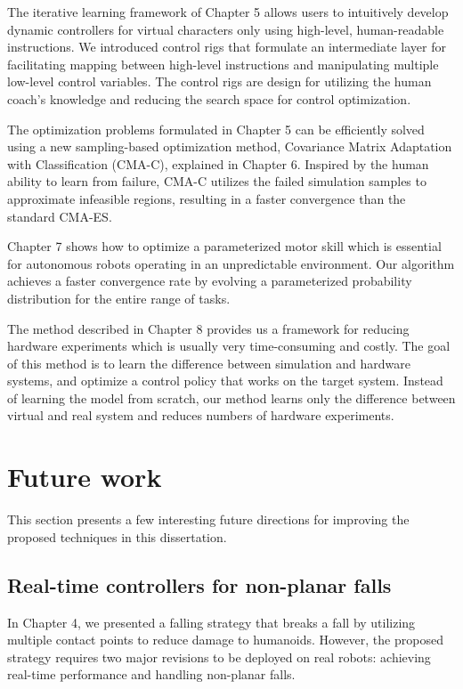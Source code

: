 The iterative learning framework of Chapter 5 allows users to intuitively
develop dynamic controllers for virtual characters only using high-level,
human-readable instructions.
We introduced control rigs that
formulate an intermediate layer 
for facilitating mapping between high-level instructions and manipulating
multiple low-level control variables.
The control rigs are design for utilizing the human coach's knowledge and 
reducing the search space for control optimization.

The optimization problems formulated in Chapter 5 can be efficiently solved
using a new sampling-based optimization method, Covariance Matrix
Adaptation with Classification (CMA-C), explained in Chapter 6.
Inspired by the human ability to learn from failure,
CMA-C utilizes the failed simulation samples to approximate infeasible regions,
resulting in a faster convergence than the standard CMA-ES.

Chapter 7 shows how to optimize a parameterized motor skill which
is essential for autonomous robots operating in an unpredictable environment.
Our algorithm achieves a faster convergence rate by evolving a parameterized
probability distribution for the entire range of tasks.

The method described in Chapter 8 provides us a framework for reducing hardware
experiments which is usually very time-consuming and costly.
The goal of this method is to learn the difference between simulation and
hardware systems, and optimize a control policy that works on the target system.
Instead of learning the model from scratch, our method learns only the
difference between virtual and real system and reduces
numbers of hardware experiments.

\section{Future work}
This section presents a few interesting future directions for improving the
proposed techniques in this dissertation.

\subsection{Real-time controllers for non-planar falls}
In Chapter 4, we presented a falling strategy that breaks a fall by
utilizing multiple contact points to reduce damage to humanoids.
However, the proposed strategy requires two major revisions to be deployed 
on real robots: achieving real-time performance and handling non-planar falls.

